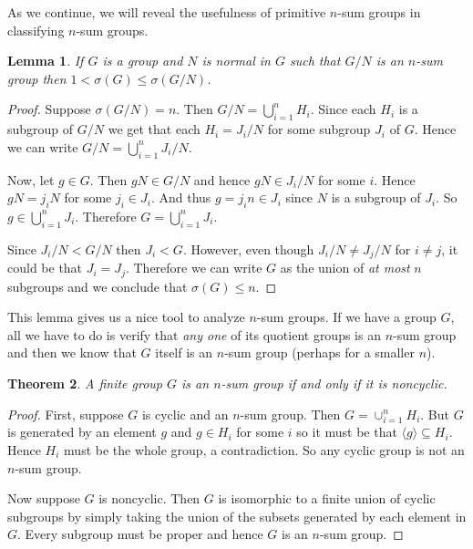 \documentclass[12pt]{amsart}
\newtheorem{theorem}{Theorem}
\newtheorem{lemma}[theorem]{Lemma}
\theoremstyle{definition}
\theoremstyle{remark}
\begin{document}
As we continue, we will reveal the usefulness of primitive \(n\)-sum groups in classifying \(n\)-sum groups.

\begin{lemma}
\label{lm.primineq}
If \( G \) is a group and \( N \) is normal in \( G \) such that \( G/N \) is an \(n\)-sum group then \( 1 < \sigma(G) \leq \sigma(G/N) \).
\end{lemma}
\begin{proof}
Suppose \( \sigma(G/N) = n \).  Then \( G/N = \bigcup_{i=1}^n H_i \).  Since each \( H_i \) is a subgroup of \( G/N \) we get that each \( H_i = J_i/N \) for some subgroup \( J_i \) of \( G \).  Hence we can write \( G/N = \bigcup_{i=1}^n J_i/N \).

Now, let \( g \in G \).  Then \( gN \in G/N \) and hence \( gN \in J_i/N \) for some \( i \).  Hence \( gN = j_iN \) for some \( j_i \in J_i \).  And thus \( g = j_in \in J_i \) since \( N \) is a subgroup of \( J_i \).  So \( g \in \bigcup_{i=1}^n J_i \).  Therefore \( G = \bigcup_{i=1}^n J_i \).

Since \( J_i/N < G/N \) then \( J_i < G \).  However, even though \( J_i/N \neq J_j/N \) for \( i \neq j \), it could be that \( J_i = J_j \).  Therefore we can write \( G \) as the union of \emph{at most} \( n \) subgroups and we conclude that \( \sigma(G) \leq n \).
\end{proof}

This lemma gives us a nice tool to analyze \(n\)-sum groups.  If we have a group \( G \), all we have to do is verify that \emph{any one} of its quotient groups is an \(n\)-sum group and then we know that \( G \) itself is an \(n\)-sum group (perhaps for a smaller \(n\)).

\begin{theorem}
A finite group \( G \) is an \(n\)-sum group if and only if it is noncyclic.
\end{theorem}
\begin{proof}
First, suppose \( G \) is cyclic and an \(n\)-sum group. Then \( G = \cup_{i=1}^n H_i \).  But \( G \) is generated by an element \( g \) and \( g \in H_i \) for some \( i \) so it must be that \( \langle g \rangle \subseteq H_i \).  Hence \( H_i \) must be the whole group, a contradiction.  So any cyclic group is not an \(n\)-sum group.

Now suppose \( G \) is noncyclic.  Then \( G \) is isomorphic to a finite union of cyclic subgroups by simply taking the union of the subsets generated by each element in \( G \).  Every subgroup must be proper and hence \( G \) is an \(n\)-sum group.
\end{proof}
\end{document}
